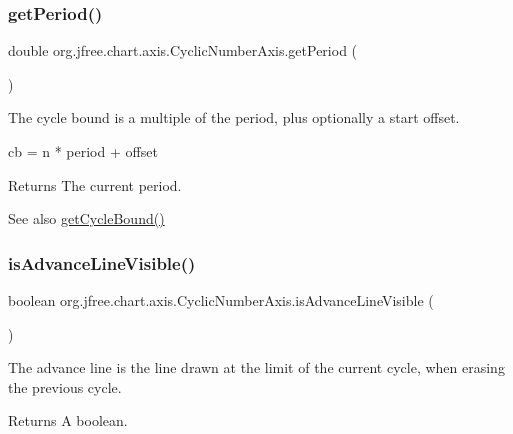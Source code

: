 \subsubsection{\texorpdfstring{get\+Period()}{getPeriod()}}
{\footnotesize\ttfamily double org.\+jfree.\+chart.\+axis.\+Cyclic\+Number\+Axis.\+get\+Period (\begin{DoxyParamCaption}{ }\end{DoxyParamCaption})}

The cycle bound is a multiple of the period, plus optionally a start offset. 
\begin{DoxyPre}cb = n * period + offset\end{DoxyPre}


\begin{DoxyReturn}{Returns}
The current period.
\end{DoxyReturn}
\begin{DoxySeeAlso}{See also}
\mbox{\hyperlink{classorg_1_1jfree_1_1chart_1_1axis_1_1_cyclic_number_axis_af988de5e084906aebb81e7f12599d827}{get\+Cycle\+Bound()}} 
\end{DoxySeeAlso}
\mbox{\label{classorg_1_1jfree_1_1chart_1_1axis_1_1_cyclic_number_axis_a103a095ff50eda5343ea00f92be6b50e}} 
\subsubsection{\texorpdfstring{is\+Advance\+Line\+Visible()}{isAdvanceLineVisible()}}
{\footnotesize\ttfamily boolean org.\+jfree.\+chart.\+axis.\+Cyclic\+Number\+Axis.\+is\+Advance\+Line\+Visible (\begin{DoxyParamCaption}{ }\end{DoxyParamCaption})}

The advance line is the line drawn at the limit of the current cycle, when erasing the previous cycle.

\begin{DoxyReturn}{Returns}
A boolean. 
\end{DoxyReturn}
\mbox{\label{classorg_1_1jfree_1_1chart_1_1axis_1_1_cyclic_number_axis_a7921ca8858aa8e9d17d9ee63217f18bd}} 
